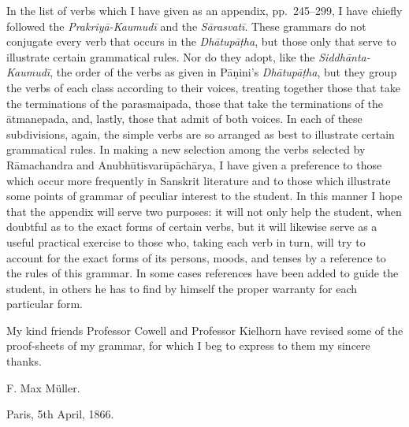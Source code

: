 In the list of verbs which I have given as an appendix, pp.\ 245–299, I
have chiefly followed the \emph{Prakriyā-Kaumudī} and the
\emph{Sārasvatī}. These grammars do not conjugate every verb that occurs
in the \emph{Dhātupāṭha}, but those only that serve to illustrate
certain grammatical rules. Nor do they adopt, like the
\emph{Siddhānta-Kaumudī}, the order of the verbs as given in Pāṇini's
\emph{Dhātupāṭha}, but they group the verbs of each class according to
their voices, treating together those that take the terminations of the
parasmaipada, those that take the terminations of the ātmanepada, and,
lastly, those that admit of both voices. In each of these subdivisions,
again, the simple verbs are so arranged as best to illustrate certain
grammatical rules. In making a new selection among the verbs selected by
Rāmachandra and Anubhūtisvarūpāchārya, I have given a preference to
those which occur more frequently in Sanskrit literature and to those
which illustrate some points of grammar of peculiar interest to the
student. In this manner I hope that the appendix will serve two
purposes: it will not only help the student, when doubtful as to the
exact forms of certain verbs, but it will likewise serve as a useful
practical exercise to those who, taking each verb in turn, will try to
account for the exact forms of its persons, moods, and tenses by a
reference to the rules of this grammar. In some cases references have
been added to guide the student, in others he has to find by himself the
proper warranty for each particular form.

My kind friends Professor Cowell and Professor Kielhorn have revised
some of the proof-sheets of my grammar, for which I beg to express to
them my sincere thanks.

F.\@ %
%
Max Müller.

Paris, 5th April, 1866.
